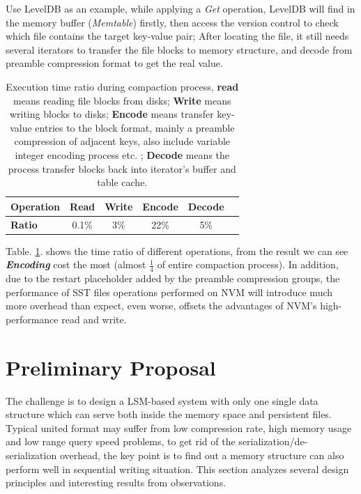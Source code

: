 Use LevelDB\cite{LevelDBo44:online} as an example, while applying a \textit{Get} operation, LevelDB will find in the memory buffer (\textit{Memtable}) firstly, then access the version control to check which file contains the target key-value pair; After locating the file, it still needs several iterators to transfer the file blocks to memory structure, and decode from preamble compression format to get the real value. 
\begin{table}[t]
	\centering
	\begin{tabular}{|l|c|c|c|c|c|}
		\hline
		\textbf{Operation} & Read & Write & Encode & Decode  \\ \hline
		\textbf{Ratio} & 0.1\% & 3\% & 22\% & 5\%  \\ \hline
	\end{tabular}
	\caption{Execution time ratio during compaction process, \textbf{read} means reading file blocks from disks; \textbf{Write} means writing blocks to disks; \textbf{Encode} means transfer key-value entries to the block format, mainly a 
		preamble compression of adjacent keys, also include variable integer encoding process etc. ; \textbf{Decode} means the process transfer blocks back into iterator's buffer and table cache.}
	\label{tab:file_read_ratio}
\end{table}

Table. \ref{tab:file_read_ratio}. shows the time ratio of different operations, from the result we can see \textbf{\textit{Encoding}} cost the most (almost $\frac{1}{4}$ of entire compaction process). In addition, due to the restart placeholder added by the preamble compression groups, the performance of SST files operations performed on NVM will introduce much more overhead than expect, even worse, offsets the advantages of NVM's high-performance read and write.

\section{Preliminary Proposal}
The challenge is to design a LSM-based system with only one single data structure which can serve both inside the memory space and persistent files. Typical united format may suffer from low compression rate, high memory usage and low range query speed problems, to get rid of the serialization/de-serialization overhead, the key point is to find out a memory structure can also perform well in sequential writing situation. This section analyzes several design principles and interesting results from observations.

